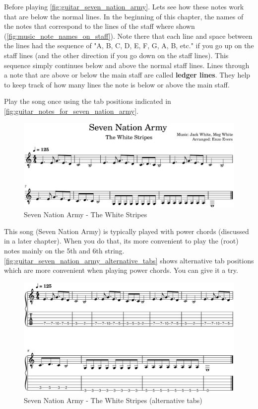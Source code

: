 Before playing \autoref{fig:guitar_seven_nation_army}. Lets see how these notes work that are below the normal lines. In the beginning of this chapter, the names of the notes that correspond to the lines of the staff where shown (\autoref{fig:music_note_names_on_staff}). Note there that each line and space between the lines had the sequence of "A, B, C, D, E, F, G, A, B, etc." if you go up on the staff lines (and the other direction if you go down on the staff lines). This sequence simply continues below and above the normal staff lines. Lines through a note that are above or below the main staff are called \textbf{ledger lines}. They help to keep track of how many lines the note is below or above the main staff.

Play the song once using the tab positions indicated in \autoref{fig:guitar_notes_for_seven_nation_army}.

\begin{figure}[h]
	\centering
	\includegraphics[width=\textwidth]{../../MuseScore/Guitar/GuitarSevenNationArmyTheWhiteStripes.png}
	\caption{Seven Nation Army - The White Stripes}
	\label{fig:guitar_seven_nation_army}
\end{figure}

\newpage

This song (Seven Nation Army) is typically played with power chords (discussed in a later chapter). When you do that, its more convenient to play the (root) notes mainly on the 5th and 6th string. \autoref{fig:guitar_seven_nation_army_alternative_tabs} shows alternative tab positions which are more convenient when playing power chords. You can give it a try.

\begin{figure}[h]
	\centering
	\includegraphics[width=\textwidth]{../../MuseScore/Guitar/GuitarSevenNationArmyTheWhiteStripes-singlestring-tab.png}
	\caption{Seven Nation Army - The White Stripes (alternative tabs)}
	\label{fig:guitar_seven_nation_army_alternative_tabs}
\end{figure}

